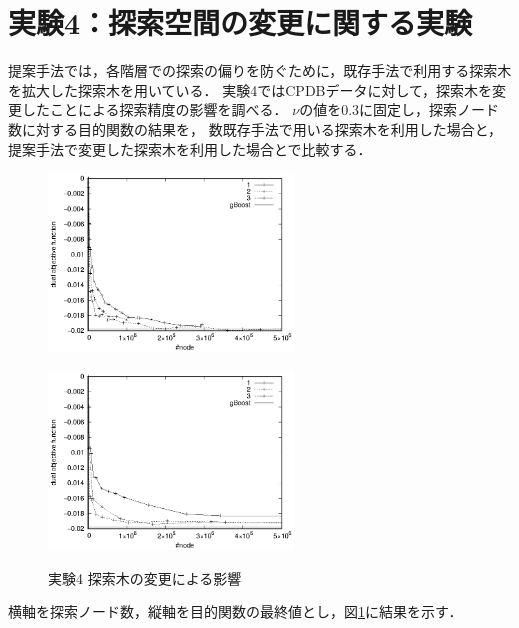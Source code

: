 \section{実験4：探索空間の変更に関する実験}
提案手法では，各階層での探索の偏りを防ぐために，既存手法で利用する探索木を拡大した探索木を用いている．
実験4ではCPDBデータに対して，探索木を変更したことによる探索精度の影響を調べる．
$\nu$の値を0.3に固定し，探索ノード数に対する目的関数の結果を，
数既存手法で用いる探索木を利用した場合と，提案手法で変更した探索木を利用した場合とで比較する．
\begin{figure}[t]
	\begin{minipage}{0.5\hsize}
		\begin{center}
			\includegraphics[width=65mm]{cpdb/purpose_node_3_tree.eps}
		\end{center}
		\vspace{0.5cm}
		\label{fig:14}
	\end{minipage}
	\begin{minipage}{0.5\hsize}
		\begin{center}
			\includegraphics[width=65mm]{cpdb/purpose_node_3.eps}
		\end{center}
		\vspace{0.5cm}
		\label{fig:15}
	\end{minipage}
	\caption{実験4 探索木の変更による影響}
	\label{tree}
\end{figure}
横軸を探索ノード数，縦軸を目的関数の最終値とし，図\ref{tree}に結果を示す．

